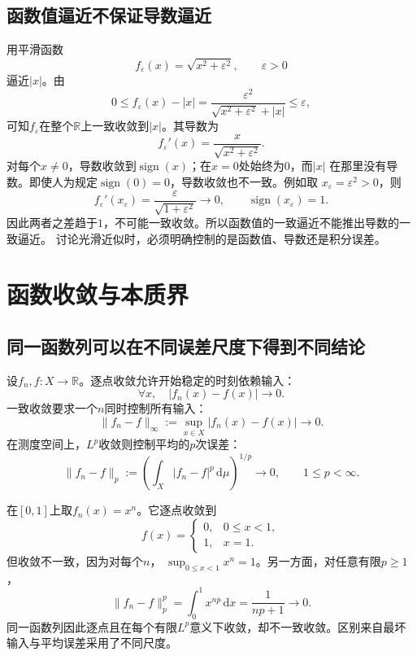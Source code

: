\subsection{函数值逼近不保证导数逼近}

用平滑函数
\[   f_{\varepsilon}(x)=\sqrt{x^2+\varepsilon^2},   \qquad \varepsilon>0 \]
逼近$|x|$。由
\[   0\leq f_{\varepsilon}(x)-|x|   =   \frac{\varepsilon^2}   {\sqrt{x^2+\varepsilon^2}+|x|}   \leq\varepsilon, \]
可知$f_{\varepsilon}$在整个$\mathbb{R}$上一致收敛到$|x|$。其导数为
\[   f_{\varepsilon}'(x)   =   \frac{x}{\sqrt{x^2+\varepsilon^2}}. \]
对每个$x\neq0$，导数收敛到$\operatorname{sign}(x)$；在$x=0$处始终为$0$，而$|x|$
在那里没有导数。即使人为规定$\operatorname{sign}(0)=0$，导数收敛也不一致。例如取
$x_\varepsilon=\varepsilon^2>0$，则
\[
  f_\varepsilon'(x_\varepsilon)
  =
  \frac{\varepsilon}{\sqrt{1+\varepsilon^2}}
  \longrightarrow0,
  \qquad
  \operatorname{sign}(x_\varepsilon)=1.
\]
因此两者之差趋于$1$，不可能一致收敛。所以函数值的一致逼近不能推出导数的一致逼近。
讨论光滑近似时，必须明确控制的是函数值、导数还是积分误差。
\section{函数收敛与本质界}
\label{sec:analysis-function-convergence-essential-bounds}
\subsection{同一函数列可以在不同误差尺度下得到不同结论}

设$f_n,f:X\to\mathbb{R}$。逐点收敛允许开始稳定的时刻依赖输入：
\[   \forall x,\quad |f_n(x)-f(x)|\to0. \]
一致收敛要求一个$n$同时控制所有输入：
\begin{equation}
  \lVert f_n-f\rVert_{\infty}
  :=
  \sup_{x\in X}|f_n(x)-f(x)|
  \longrightarrow0.
\label{eq:analysis-uniform-convergence}
\end{equation}
在测度空间上，$L^p$收敛则控制平均的$p$次误差：
\begin{equation}
  \lVert f_n-f\rVert_p
  :=
  \left(
    \int_X|f_n-f|^p\,\mathrm{d}\mu
  \right)^{1/p}
  \longrightarrow0,
  \qquad 1\leq p<\infty.
\label{eq:analysis-lp-convergence}
\end{equation}

在$[0,1]$上取$f_n(x)=x^n$。它逐点收敛到
\[   f(x)=
\begin{cases}     0, & 0\leq x<1,\\     1, & x=1.
\end{cases} \]
但收敛不一致，因为对每个$n$， $\sup_{0\leq x<1}x^n=1$。另一方面，对任意有限$p\geq1$，
\[   \lVert f_n-f\rVert_p^p   =   \int_0^1x^{np}\,\mathrm{d}x   =   \frac{1}{np+1}   \longrightarrow0. \]
同一函数列因此逐点且在每个有限$L^p$意义下收敛，却不一致收敛。区别来自最坏输入与平均误差采用了不同尺度。

